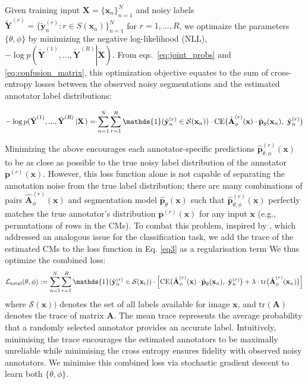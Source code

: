 Given training input $\textbf{X}=\{\textbf{x}_n\}_{n=1}^N$ and noisy labels ${\tilde{\textbf{Y}}^{(r)}} = \{ \tilde{ \textbf{y}}_n^{(r)}: r \in S(\mathbf{x}_n)\} _{n = 1}^N$ for $r=1,...,R$, we optimaize the parameters $\{ \theta , \phi \}$ by minimizing the negative log-likelihood (NLL), $ - \log p({\tilde{\textbf{Y}}^{(1)}},...,{\tilde{\textbf{Y}}^{(R)}}\left| \textbf{X} \right.)$. From eqs.~\ref{eq:joint_probs} and \ref{eq:confusion_matrix}, this optimization objective equates to the sum of cross-entropy losses between the observed noisy segmentations and the estimated annotator label distributions:

\begin{equation}
    - \log p({\tilde{\textbf{Y}}^{(1)}},...,{\tilde{\textbf{Y}}^{(R)}}\left| \textbf{X} \right.) 
    = \sum\limits_{n = 1}^N {\sum\limits_{r = 1}^R  \mathds{1}(\tilde{\textbf{y}}_n^{(r)} \in \mathcal{S}({\textbf{x}_n}))}  \cdot
    \text{CE}\big{(}\hat{\textbf{A}}_{\phi}^{(r)}(\textbf{x})\cdot \hat{\textbf{p}}_\theta ({\textbf{x}_n}),\,\,\tilde{\textbf{y}}_n^{(r)}\big{)} 
\end{equation}\label{eq3}

Minimizing the above encourages each annotator-specific predictions $\hat{\textbf{p}}_{\theta, \phi}^{(r)}(\textbf{x})$ to be as close as possible to the true noisy label distribution of the annotator ${\textbf{p}^{(r)}}(\textbf{x})$. However, this loss function alone is not capable of separating the annotation noise from the true label distribution; there are many combinations of pairs $ {\hat{\textbf{A}}_{\phi}^{(r)}}(\mathbf{x})$ and segmentation model $\hat{\textbf{p}}_\theta(\mathbf{x})$ such that $\hat{\textbf{p}}_{\theta, \phi}^{(r)}(\textbf{x})$ perfectly matches the true annotator's distribution $\textbf{p}^{(r)}(\mathbf{x})$ for any input $\textbf{x}$ (e.g., permutations of rows in the CMs). To combat this problem, inspired by \cite{tanno2019learning}, which addressed an analogous issue for the classification task, we add the trace of the estimated CMs to the loss function in Eq. \ref{eq3} as a regularisation term %
We thus optimize the combined loss:
\begin{equation}
    \mathcal{L}_{\text{total}}(\theta, \phi) := \sum\limits_{n = 1}^N {\sum\limits_{r = 1}^R \mathds{1}(\tilde{\textbf{y}}_n^{(r)} \in \mathcal{S}({\textbf{x}_i}))} \cdot \Big{[} \text{CE}\big{(}\hat{\textbf{A}}_{\phi}^{(r)}(\textbf{x})\cdot \hat{\textbf{p}}_\theta({\textbf{x}_n}),\,\,\tilde{\textbf{y}}_n^{(r)}\big{)} + \lambda\cdot \text{tr}\big{(}\hat{\textbf{A}}_{\phi}^{(r)}(\mathbf{x}_{n})\big{)}\Big{]}
\end{equation}\label{eq4}
where $\mathcal{S}({\textbf{x}}))$ denotes the set of all labels available for image $\textbf{x}$, and $\text{tr}({\textbf{A}})$ denotes the trace of matrix $\textbf{A}$. The mean trace represents the average probability that a randomly selected annotator provides an accurate label. Intuitively, minimising the trace encourages the estimated annotators to be maximally unreliable while minimising the cross entropy ensures fidelity with observed noisy annotators. We minimise this combined loss via stochastic gradient descent to learn both $\{ \theta ,\phi\}$.  

